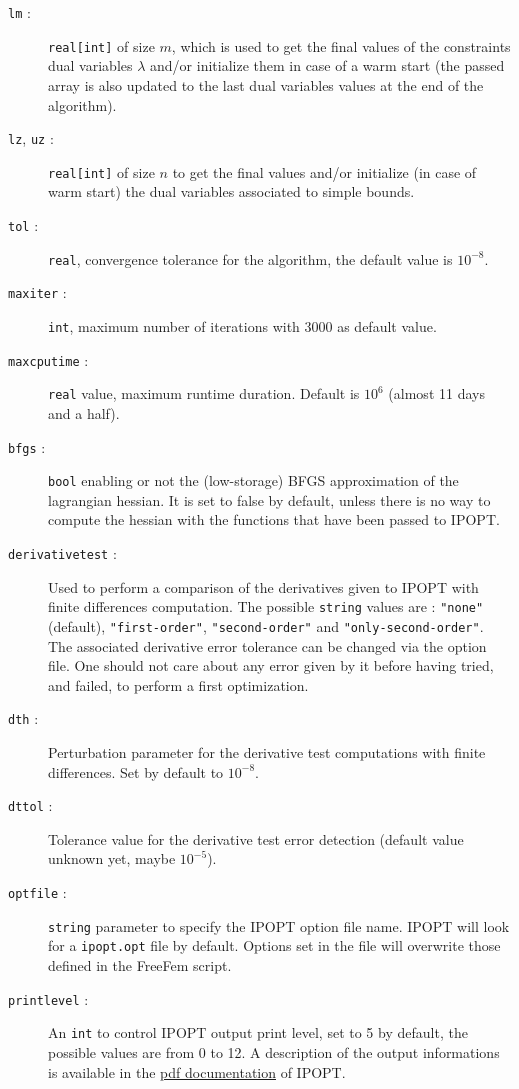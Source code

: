 \documentclass[a4paper,twoside,12pt]{book}
\begin{document}
\begin{description}
  \item[\texttt{lm} :]  {\tt real[int]} of size $m$, which is used  to get the final values of the constraints dual variables $\lambda$ and/or initialize them in case of a warm start (the passed array is also updated to the last dual variables values at the end of the algorithm).
  \item[\texttt{lz}, \texttt{uz} :] {\tt real[int]} of size $n$ to get the final values and/or initialize (in case of warm start) the dual variables associated to simple bounds.
  \item[\texttt{tol} :] {\tt real}, convergence tolerance for the algorithm, the default value is $10^{-8}$.
  \item[\texttt{maxiter} :] {\tt int}, maximum number of iterations with 3000 as default value.
  \item[\texttt{maxcputime} :] {\tt real} value, maximum runtime duration. Default is $10^{6}$ (almost 11 days and a half).
  \item[\texttt{bfgs} :] {\tt bool} enabling or not the (low-storage) BFGS approximation of the lagrangian hessian. It is set to false by default, unless there is no way to compute the hessian with the functions that have been passed to IPOPT.
  \item[\texttt{derivativetest} :] Used to perform a comparison of the derivatives given to IPOPT with finite differences computation. The possible {\tt string} values are : {\tt "none"} (default), {\tt "first-order"}, {\tt "second-order"} and {\tt "only-second-order"}. The associated derivative error tolerance can be changed via the option file. One should not care about any error given by it before having tried, and failed, to perform a first optimization.
  \item[\texttt{dth} : ] Perturbation parameter for the derivative test computations with finite differences. Set by default to $10^{-8}$.
  \item[\texttt{dttol} :] Tolerance value for the derivative test error detection (default value unknown yet, maybe $10^{-5}$).
  \item[\texttt{optfile} :] {\tt string} parameter to specify the IPOPT option file name. IPOPT will look for a {\tt ipopt.opt} file by default. Options set in the file will overwrite those defined in the FreeFem script.
  \item[\texttt{printlevel} :] An {\tt int} to control IPOPT output print level, set to 5 by default, the possible values are from 0 to 12. A description of the output informations is available in the \href{https://projects.coin-or.org/Ipopt/browser/stable/3.10/Ipopt/doc/documentation.pdf?format=raw}{pdf documentation} of IPOPT.

\end{description}
\end{document}
